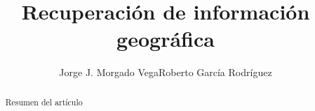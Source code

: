 \documentclass{irsarticle}
\begin{document}
\title{\bf Recuperación de información geográfica}
\author{Jorge J. Morgado Vega\qquad Roberto García Rodríguez}
\date{}
\maketitle


\begin{abstract}
	Resumen del artículo
\end{abstract}


\newpage
\tableofcontents
\newpage







\end{document}
